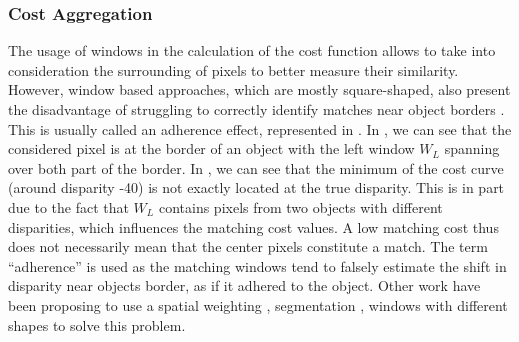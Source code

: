 \subsubsection{Cost Aggregation}
The usage of windows in the calculation of the cost function allows to take into consideration the surrounding of pixels to better measure their similarity. However, window based approaches, which are mostly square-shaped, also present the disadvantage of struggling to correctly identify matches near object borders \cite{hirschmuller_real-time_2002}. This is usually called an adherence effect, represented in . In , we can see that the considered pixel is at the border of an object with the left window $W_L$ spanning over both part of the border. In , we can see that the minimum of the cost curve (around disparity -40) is not exactly located at the true disparity. This is in part due to the fact that $W_L$ contains pixels from two objects with different disparities, which influences the matching cost values. A low matching cost thus does not necessarily mean that the center pixels constitute a match. The term ``adherence'' is used as the matching windows tend to falsely estimate the shift in disparity near objects border, as if it adhered to the object. Other work have been proposing to use a spatial weighting \cite{kuk-jin_yoon_locally_2005}, segmentation \cite{hutchison_segmentation-based_2007}, windows with different shapes \cite{ke_zhang_cross-based_2009, buades_reliable_2015} to solve this problem. 

